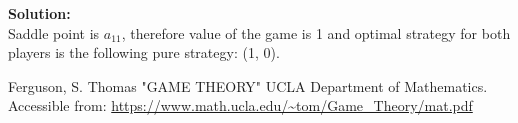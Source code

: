 \documentclass[12pt, titlepage]{article}
\begin{document}
\vskip1cm

\textbf{Solution:}\\
Saddle point is $a_{11}$, therefore value of the game is 1 and optimal strategy for both players is the following pure strategy: (1, 0).


\begin{thebibliography}{0}
   Ferguson, S. Thomas "GAME THEORY" UCLA Department of Mathematics. Accessible from: \url{https://www.math.ucla.edu/~tom/Game_Theory/mat.pdf}

  
\end{thebibliography}
\end{document}
